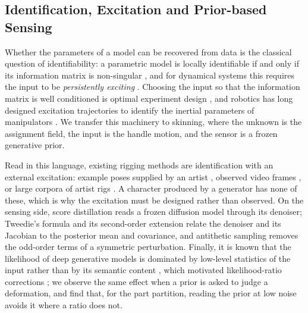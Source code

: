 \documentclass[lettersize,journal]{IEEEtran}
\newenvironment{revblock}{\par\color{red}}{\par}
\begin{document}
\begin{revblock}
\subsection{Identification, Excitation and Prior-based Sensing}
Whether the parameters of a model can be recovered from data is the classical question of
identifiability: a parametric model is locally identifiable if and only if its information
matrix is non-singular \cite{rothenberg1971identification}, and for dynamical systems this
requires the input to be \textit{persistently exciting} \cite{ljung1999system}. Choosing the
input so that the information matrix is well conditioned is optimal experiment design
\cite{kiefer1960equivalence}, and robotics has long designed excitation trajectories to
identify the inertial parameters of manipulators \cite{gautier1992exciting,swevers1997optimal}.
We transfer this machinery to skinning, where the unknown is the assignment field, the input is
the handle motion, and the sensor is a frozen generative prior.

Read in this language, existing rigging methods are identification with an external excitation:
example poses supplied by an artist \cite{le2012smooth}, observed video frames
\cite{huang2024scgs}, or large corpora of artist rigs
\cite{zhang2025unirig,liu2025riganything,song2026puppeteer}. A character produced by a
generator has none of these, which is why the excitation must be designed rather than
observed. On the sensing side, score distillation \cite{poole2022dreamfusion} reads a frozen
diffusion model through its denoiser; Tweedie's formula \cite{efron2011tweedie} and its
second-order extension \cite{meng2021estimating,manor2024posterior} relate the denoiser and its
Jacobian to the posterior mean and covariance, and antithetic sampling \cite{salimans2017evolution}
removes the odd-order terms of a symmetric perturbation. Finally, it is known that the
likelihood of deep generative models is dominated by low-level statistics of the input rather
than by its semantic content \cite{nalisnick2019deep}, which motivated likelihood-ratio
corrections \cite{ren2019likelihood}; we observe the same effect when a prior is asked to judge
a deformation, and find that, for the part partition, reading the prior at low noise avoids it
where a ratio does not.
\end{revblock}
\end{document}
